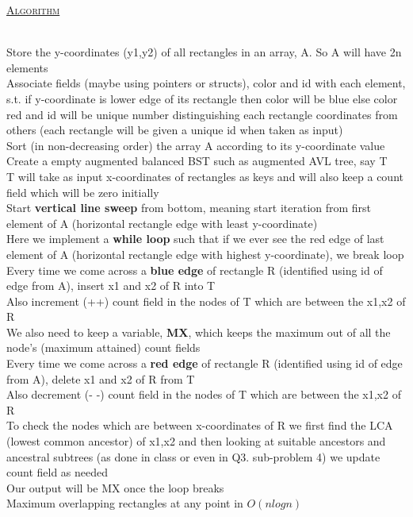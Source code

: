 \documentclass[a4 paper]{article}
\begin{document}
\newpage
{}
\underline{\textsc{Algorithm}}\\\\
\begin{algorithm}[H]
\SetAlgoLined
{}
Store the y-coordinates (y1,y2) of all rectangles in an array, A. So A will have 2n elements\\
Associate fields (maybe using pointers or structs), color and id with each element, s.t. if y-coordinate is lower edge of its rectangle then color will be blue else color red and id will be unique number distinguishing each rectangle coordinates from others (each rectangle will be given a unique id when taken as input)\\
Sort (in non-decreasing order) the array A according to its y-coordinate value\\
Create a empty augmented balanced BST such as augmented AVL tree, say T\\
T will take as input x-coordinates of rectangles as keys and will also keep a count field which will be zero initially\\
Start \textbf{vertical line sweep} from bottom, meaning start iteration from first element of A (horizontal rectangle edge with least y-coordinate)\\
Here we implement a \textbf{while loop} such that if we ever see the red edge of last element of A (horizontal rectangle edge with highest y-coordinate), we break loop\\
Every time we come across a \textbf{blue edge} of rectangle R (identified using id of edge from A), insert x1 and x2 of R into T\\
Also increment (++) count field in the nodes of T which are between the x1,x2 of R \\
We also need to keep a variable, \textbf{MX}, which keeps the maximum out of all the node's (maximum attained) count fields\\
Every time we come across a \textbf{red edge} of rectangle R (identified using id of edge from A), delete x1 and x2 of R from T\\
Also decrement (- -) count field in the nodes of T which are between the x1,x2 of R \\
To check the nodes which are between x-coordinates of R we first find the LCA (lowest common ancestor) of x1,x2 and then looking at suitable ancestors and ancestral subtrees (as done in class or even in Q3. sub-problem 4) we update count field as needed\\
Our output will be MX once the loop breaks\\
\caption{Maximum overlapping rectangles at any point in $O(nlogn)$}
\end{algorithm}
\end{document}

